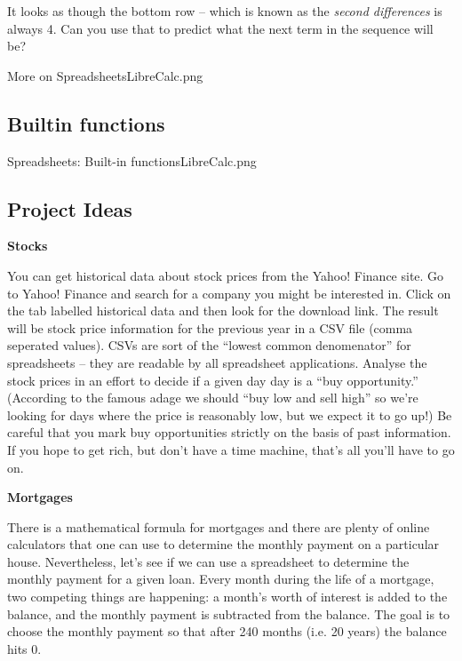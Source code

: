 It looks as though the bottom row -- which is known as the {\em second differences} is always 4.  Can you use that to predict what the next term in the sequence will be?

\clearpage
\begin{worksheet}{12}{More on Spreadsheets}{LibreCalc.png}

\end{worksheet}
\clearpage



\subsection{Builtin functions}


\clearpage
\begin{worksheet}{13}{Spreadsheets: Built-in functions}{LibreCalc.png}

\end{worksheet}
\clearpage

\subsection{Project Ideas}

{\bf Stocks}

You can get historical data about stock prices from the Yahoo! Finance site.  Go to Yahoo! Finance and search for a company you might be interested in.  Click on the tab labelled historical data and then look for the download link.  The result will be stock price information for the previous year in a CSV file (comma seperated values).  CSVs are sort of the ``lowest common denomenator'' for spreadsheets -- they are readable by all spreadsheet applications.  Analyse the stock prices in an effort to decide if a given day day is a ``buy opportunity.''  (According to the famous adage we should ``buy low and sell high'' so we're looking for days where the price is reasonably low, but we expect it to go up!)  Be careful that you mark buy opportunities strictly on the basis of past information.  If you hope to get rich, but don't have a time machine, that's all you'll have to go on.

{\bf Mortgages}

There is a mathematical formula for mortgages and there are plenty of online calculators that one can use to determine the monthly payment on a particular house.  Nevertheless, let's see if we can use a spreadsheet to determine the monthly payment for a given loan.  Every month during the life of a mortgage, two competing things are happening:  a month's worth of interest is added to the balance, and the monthly payment is subtracted from the balance. The goal is to choose the monthly payment so that after 240 months (i.e. 20 years) the balance hits 0.

